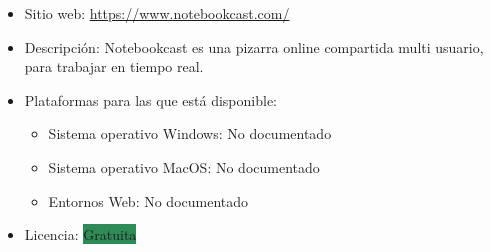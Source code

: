 \documentclass[11pt]{article}
\newcommand{\nodoc}{No documentado}
\newcommand{\gratis}{\colorbox{SeaGreen}{Gratuita}}
\begin{document}
\begin{itemize}
\item Sitio web: \url{https://www.notebookcast.com/}
\item Descripción: Notebookcast es una pizarra online compartida multi usuario, para trabajar en tiempo real.
\item Plataformas para las que está disponible:
  \begin{itemize}
  \item Sistema operativo Windows: \nodoc
  \item Sistema operativo MacOS: \nodoc
  \item Entornos Web: \nodoc
  \end{itemize}
\item Licencia: \gratis
\end{itemize}
\end{document}
